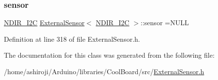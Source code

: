 \subsubsection{\texorpdfstring{sensor}{sensor}}
{\footnotesize\ttfamily \hyperlink{class_n_d_i_r___i2_c}{N\+D\+I\+R\+\_\+\+I2C} \hyperlink{class_external_sensor}{External\+Sensor}$<$ \hyperlink{class_n_d_i_r___i2_c}{N\+D\+I\+R\+\_\+\+I2C} $>$\+::sensor =N\+U\+LL\hspace{0.3cm}{\ttfamily [private]}}



Definition at line 318 of file External\+Sensor.\+h.



The documentation for this class was generated from the following file\+:\begin{DoxyCompactItemize}
\item 
/home/ashiroji/\+Arduino/libraries/\+Cool\+Board/src/\hyperlink{_external_sensor_8h}{External\+Sensor.\+h}\end{DoxyCompactItemize}
